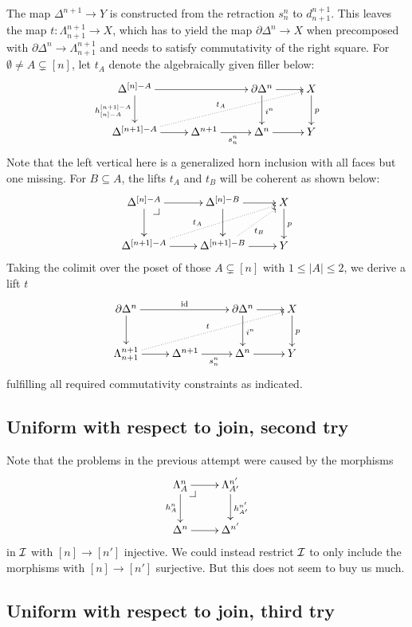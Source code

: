 \documentclass[reqno,10pt,a4paper,oneside]{amsart}
\begin{document}
The map $\Delta^{n+1} \to Y$ is constructed from the retraction $s_n^n$ to $d_{n+1}^{n+1}$.
This leaves the map $t : \Lambda_{n+1}^{n+1} \to X$, which has to yield the map $\partial \Delta^n \to X$ when precomposed with $\partial \Delta^n \to \Lambda_{n+1}^{n+1}$ and needs to satisfy commutativity of the right square.
For $\emptyset \neq A \subsetneq [n]$, let $t_A$ denote the algebraically given filler below:
\[
\xymatrix{
  \Delta^{[n] - A}
  \ar[rr]
  \ar[d]_{h_{[n] - A}^{[n+1] - A}}
&&
  \partial \Delta^n
  \ar[r]
  \ar[d]^{i^n}
&
  X
  \ar[d]^{p}
\\
  \Delta^{[n+1] - A}
  \ar[r]
  \ar@{.>}[urrr]^{t_A}
&
  \Delta^{n+1}
  \ar[r]_{s_n^n}
&
  \Delta^n
  \ar[r]
&
  Y
}
\]
Note that the left vertical here is a generalized horn inclusion with all faces but one missing.
For $B \subseteq A$, the lifts $t_A$ and $t_B$ will be coherent as shown below:
\[
\xymatrix{
  \Delta^{[n] - A}
  \ar[r]
  \ar[d]
  \pullback{dr}
&
  \Delta^{[n] - B}
  \ar[r]
  \ar[d]
&
  X
  \ar[d]^{p}
\\
  \Delta^{[n+1] - A}
  \ar[r]
  \ar@{.>}[urr]^(0.4){t_A}
&
  \Delta^{[n+1] - B}
  \ar[r]
  \ar@{.>}[ur]_{t_B}
&
  Y
}
\]
Taking the colimit over the poset of those $A \subsetneq [n]$ with $1 \leq |A| \leq 2$, we derive a lift $t$
\[
\xymatrix{
  \partial \Delta^n
  \ar[rr]^{\id}
  \ar[d]
  &&
  \partial \Delta^n
  \ar[r]
  \ar[d]^{i^n}
  &
  X
  \ar[d]^{p}
  \\
  \Lambda_{n+1}^{n+1}
  \ar[r]
  \ar@{.>}[urrr]^{t}
  &
  \Delta^{n+1}
  \ar[r]_{s_n^n}
  &
  \Delta^n
  \ar[r]
  &
  Y
}
\]
fulfilling all required commutativity constraints as indicated.

\subsection*{Uniform with respect to join, second try}

Note that the problems in the previous attempt were caused by the morphisms
\[
\xymatrix{
  \Lambda_A^n
  \ar[r]
  \ar[d]_{h_A^n}
  \pullback{dr}
&
  \Lambda_{A'}^{n'}
  \ar[d]^{h_{A'}^{n'}}
\\
  \Delta^{n}
  \ar[r]
&
  \Delta^{n'}
}
\] 
in $\cal{I}$ with $[n] \to [n']$ injective.
We could instead restrict $\cal{I}$ to only include the morphisms with $[n] \to [n']$ surjective.
But this does not seem to buy us much.

\subsection*{Uniform with respect to join, third try}
\end{document}
